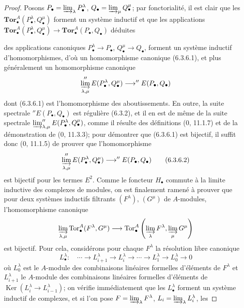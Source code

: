 \begin{proof}
Posons $P_\bullet=\varinjlim_\lambda P_\bullet^\lambda$,
$Q_\bullet=\varinjlim_\mu Q_\bullet^\mu$; par fonctorialité, il est clair que
les $\mathbf{Tor}_\bullet^A(P_\bullet^\lambda,Q_\bullet^\mu)$ forment un
système inductif et que les applications
$\mathbf{Tor}_\bullet^A(P_\bullet^\lambda,Q_\bullet^\mu)\to
\mathbf{Tor}_\bullet^A(P_\bullet,Q_\bullet)$ déduites


des applications canoniques $P_\bullet^\lambda\to P_\bullet$,
$Q_\bullet^\mu\to Q_\bullet$, forment un système inductif d'homomorphismes,
d'où un homomorphisme canonique (6.3.6.1), et plus généralement un
homomorphisme canonique
\[
  \varinjlim_{\lambda,\mu}''E(P_\bullet^\lambda,Q_\bullet^\mu)
  \longrightarrow ''E(P_\bullet,Q_\bullet)
\]
dont (6.3.6.1) est l'homomorphisme des aboutissements. En outre, la suite
spectrale $''E(P_\bullet,Q_\bullet)$ est régulière (6.3.2), et il en est de
même de la suite spectrale
$\varinjlim_{\lambda,\mu}''E(P_\bullet^\lambda,Q_\bullet^\mu)$, comme il
résulte des définitions (0, 11.1.7) et de la démonstration de (0, 11.3.3);
pour démontrer que (6.3.6.1) est bijectif, il suffit donc (0, 11.1.5) de
prouver que l'homomorphisme
\[
  \varinjlim_{\lambda,\mu}''E(P_\bullet^\lambda,Q_\bullet^\mu)
  \longrightarrow ''E(P_\bullet,Q_\bullet)
  \tag{6.3.6.2}\label{III.6.3.6.2.fr}
\]
est bijectif pour les termes $E^2$. Comme le foncteur $H_\bullet$ commute à
la limite inductive des complexes de modules, on est finalement ramené à
prouver que pour deux systèmes inductifs filtrants $(F^\lambda)$,
$(G^\mu)$ de $A$-modules, l'homomorphisme canonique
\[
  \varinjlim_{\lambda,\mu}\operatorname{Tor}_\bullet^A(F^\lambda,G^\mu)
  \longrightarrow
  \operatorname{Tor}_\bullet^A
  \left(\varinjlim_\lambda F^\lambda,
        \varinjlim_\mu G^\mu\right)
\]
est bijectif. Pour cela, considérons pour chaque $F^\lambda$ la résolution
libre canonique
\[
  L_\bullet^\lambda:\quad
  \cdots\longrightarrow L_{i+1}^\lambda
  \longrightarrow L_i^\lambda\longrightarrow\cdots
  \longrightarrow L_1^\lambda\longrightarrow L_0^\lambda\longrightarrow0
\]
où $L_0^\lambda$ est le $A$-module des combinaisons linéaires formelles
d'éléments de $F^\lambda$ et $L_{i+1}^\lambda$ le $A$-module des combinaisons
linéaires formelles d'éléments de
$\operatorname{Ker}(L_i^\lambda\to L_{i-1}^\lambda)$; on vérifie
immédiatement que les $L_\bullet^\lambda$ forment un système inductif de
complexes, et si l'on pose
$F=\varinjlim_\lambda F^\lambda$, $L_i=\varinjlim_\lambda L_i^\lambda$, les

\end{proof}
